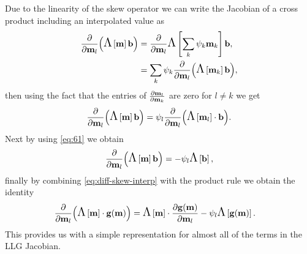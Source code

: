 Due to the linearity of the skew operator we can write the Jacobian of a cross product including an interpolated value as 
\begin{equation}
  \begin{aligned}
    \frac{\partial }{\partial \mathbf{m}_l} {\left( \text{\Large{$\Lambda$}}\left[ \mathbf{m} \right] {\mathbf{b}} \right)} &= \frac{\partial }{\partial \mathbf{m}_l} \text{\Large{$\Lambda$}}\left[ \sum_{k} {\psi_k} \mathbf{m}_{k} \right] {\mathbf{b}}, \\
    &= \sum_k \psi_k \frac{\partial }{\partial \mathbf{m}_l} {\left( \text{\Large{$\Lambda$}}\left[ \mathbf{m}_k \right] {\mathbf{b}} \right)},
  \end{aligned} 
\end{equation}
then using the fact that the entries of $\frac{\partial \mathbf{m}_{l}}{\partial \mathbf{m}_{k}}$ are zero for $l \neq k$ we get
\begin{equation}
  \frac{\partial }{\partial \mathbf{m}_l} {\left( \text{\Large{$\Lambda$}}\left[ \mathbf{m} \right] {\mathbf{b}} \right)}  = \psi_l \frac{\partial }{\partial \mathbf{m}_l} {\left( \text{\Large{$\Lambda$}}\left[ \mathbf{m}_l \right] \cdot {\mathbf{b}} \right)}.
\end{equation}
Next by using \eqref{eq:61} we obtain
\begin{equation}
  \pd{}{\mv_l} \bigb{\skewm{\mv} \bv} = - \sbf_l\skewm{\bv},
  \label{eq:diff-skew-interp}
\end{equation}
finally by combining \eqref{eq:diff-skew-interp} with the product rule we obtain the identity
\begin{equation}
  \begin{aligned}
    \pd{}{\mv_l} \bigb{\skewm{\mv}\cdot \gv(\mv)} 
    &= \skewm{\mv}\cdot \pd{\gv(\mv)}{\mv_l} - \sbf_l \skewm{\gv(\mv)}.
    \label{eq:68}
  \end{aligned}
\end{equation}
This provides us with a simple representation for almost all of the terms in the LLG Jacobian.



